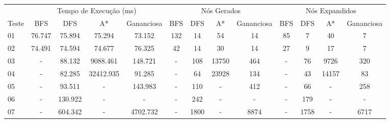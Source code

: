 \documentclass[12pt,a4paper]{article}
\begin{document}
\begin{adjustbox}{width={\textwidth}, totalheight={\textheight}, keepaspectratio}
      \begin{tabular}{l cccc cccc cccc}
            \toprule
                  & \multicolumn{4}{c}{Tempo de Execução (ms)} & \multicolumn{4}{c}{Nós Gerados} & \multicolumn{4}{c}{Nós Expandidos}                                                                                  \\
            \cmidrule(lr){2-5} \cmidrule(lr){6-9} \cmidrule(lr){10-13}
            Teste & BFS                                        & DFS                             & A*                                 & Gananciosa & BFS & DFS  & A*    & Gananciosa & BFS & DFS  & A*    & Gananciosa \\
            \midrule
            01    & 76.747                                     & 75.894                          & 75.294                             & 73.152     & 132 & 14   & 54    & 14         & 85  & 7    & 40    & 7          \\
            02    & 74.491                                     & 74.594                          & 74.677                             & 76.325     & 42  & 14   & 30    & 14         & 27  & 9    & 17    & 7          \\
            03    & -                                          & 88.132                          & 9088.461                           & 148.721    & -   & 108  & 13750 & 464        & -   & 76   & 9726  & 320        \\
            04    & -                                          & 82.285                          & 32412.935                          & 91.285     & -   & 64   & 23928 & 134        & -   & 43   & 14157 & 83         \\
            05    & -                                          & 93.511                          & -                                  & 143.983    & -   & 110  & -     & 412        & -   & 66   & -     & 258        \\
            06    & -                                          & 130.922                         & -                                  & -          & -   & 242  & -     & -          & -   & 179  & -     & -          \\
            07    & -                                          & 604.342                         & -                                  & 4702.732   & -   & 1800 & -     & 8874       & -   & 1758 & -     & 6717       \\

\end{tabular}
\end{adjustbox}
\end{document}

